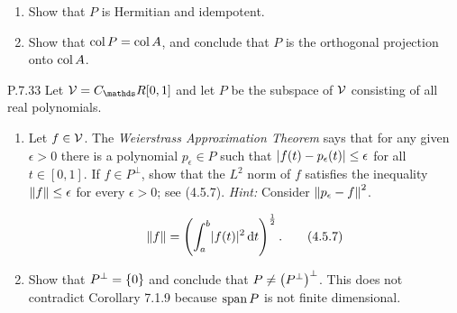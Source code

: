 \documentclass{../homework}
\begin{document}
\begin{problems}
\begin{enumerate}
    \begin{solution}

    \end{solution}

  \item Show that \(P\) is Hermitian and idempotent.

    \begin{solution}

    \end{solution}

  \item Show that \(\operatorname{col} P = \operatorname{col} A\), and conclude that \(P\) is the
    orthogonal projection onto \(\operatorname{col} A\).

    \begin{solution}

    \end{solution}
  \end{enumerate}

\item[P.7.33] Let \(\Vspace = C_\RR [0, 1]\) and let \(P\) be the
  subspace of \(\mathcal{V}\) consisting of all real polynomials.
  \begin{enumerate}
  \item Let \(f \in \mathcal{V}\).  The \textit{Weierstrass Approximation
      Theorem} says that for any given \(\epsilon > 0\) there is a
    polynomial \(p_\epsilon \in P\) such that
    \(\left\lvert {f(t) - p_\epsilon(t)} \right\rvert \le \epsilon\) for all
    \(t \in [0, 1]\).  If \(f \in P^\perp\), show that the \(L^2\)
    norm of \(f\) satisfies the inequality \(\lVert {f} \rVert \le \epsilon\)
    for every \(\epsilon > 0\); see (4.5.7).  \textit{Hint:} Consider
    \(\left\lVert {p_\epsilon - f} \right\rVert^2\).
    \begin{book}
      \[
        \lVert {f} \rVert = \left( {\int_a^b \lvert {f(t)} \rvert^2 \mathop{}\! \mathrm d t} \right)^{\frac 1 2}.
        \tag{4.5.7}
      \]
    \end{book}

    \begin{solution}

    \end{solution}

  \item Show that \(P^\perp = \{ {0} \}\) and conclude that
    \(P \ne \left( {P^\perp} \right)^\perp\).  This does not contradict
    Corollary 7.1.9 because \(\operatorname{span} P\) is not finite dimensional.

    \begin{solution}

    \end{solution}
  \end{enumerate}


\end{problems}
\end{document}
